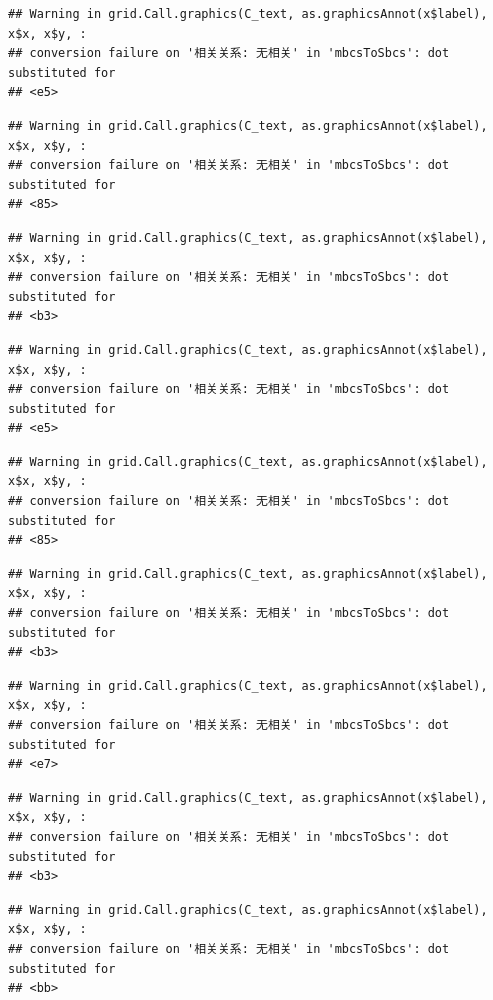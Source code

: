 \documentclass[
]{book}
\begin{document}
\begin{verbatim}
## Warning in grid.Call.graphics(C_text, as.graphicsAnnot(x$label), x$x, x$y, :
## conversion failure on '相关关系: 无相关' in 'mbcsToSbcs': dot substituted for
## <e5>
\end{verbatim}

\begin{verbatim}
## Warning in grid.Call.graphics(C_text, as.graphicsAnnot(x$label), x$x, x$y, :
## conversion failure on '相关关系: 无相关' in 'mbcsToSbcs': dot substituted for
## <85>
\end{verbatim}

\begin{verbatim}
## Warning in grid.Call.graphics(C_text, as.graphicsAnnot(x$label), x$x, x$y, :
## conversion failure on '相关关系: 无相关' in 'mbcsToSbcs': dot substituted for
## <b3>
\end{verbatim}

\begin{verbatim}
## Warning in grid.Call.graphics(C_text, as.graphicsAnnot(x$label), x$x, x$y, :
## conversion failure on '相关关系: 无相关' in 'mbcsToSbcs': dot substituted for
## <e5>
\end{verbatim}

\begin{verbatim}
## Warning in grid.Call.graphics(C_text, as.graphicsAnnot(x$label), x$x, x$y, :
## conversion failure on '相关关系: 无相关' in 'mbcsToSbcs': dot substituted for
## <85>
\end{verbatim}

\begin{verbatim}
## Warning in grid.Call.graphics(C_text, as.graphicsAnnot(x$label), x$x, x$y, :
## conversion failure on '相关关系: 无相关' in 'mbcsToSbcs': dot substituted for
## <b3>
\end{verbatim}

\begin{verbatim}
## Warning in grid.Call.graphics(C_text, as.graphicsAnnot(x$label), x$x, x$y, :
## conversion failure on '相关关系: 无相关' in 'mbcsToSbcs': dot substituted for
## <e7>
\end{verbatim}

\begin{verbatim}
## Warning in grid.Call.graphics(C_text, as.graphicsAnnot(x$label), x$x, x$y, :
## conversion failure on '相关关系: 无相关' in 'mbcsToSbcs': dot substituted for
## <b3>
\end{verbatim}

\begin{verbatim}
## Warning in grid.Call.graphics(C_text, as.graphicsAnnot(x$label), x$x, x$y, :
## conversion failure on '相关关系: 无相关' in 'mbcsToSbcs': dot substituted for
## <bb>
\end{verbatim}
\end{document}
